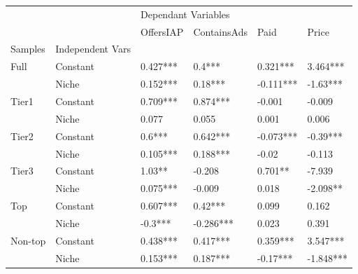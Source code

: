 \begin{table}[h!]
\centering
\begin{tabular}{llllll}
\toprule
        &       & \multicolumn{4}{l}{Dependant Variables} \\
        &       &           OffersIAP & ContainsAds &       Paid &      Price \\
Samples & Independent Vars &                     &             &            &            \\
\midrule
\multirow{2}{*}{Full} & Constant &  0.427*** &  0.4*** &  0.321*** &  3.464*** \\
        & Niche &  0.152*** &  0.18*** &  -0.111*** &  -1.63*** \\
\cline{1-6}
\multirow{2}{*}{Tier1} & Constant &  0.709*** &  0.874*** &  -0.001 &  -0.009 \\
        & Niche &  0.077 &  0.055 &  0.001 &  0.006 \\
\cline{1-6}
\multirow{2}{*}{Tier2} & Constant &  0.6*** &  0.642*** &  -0.073*** &  -0.39*** \\
        & Niche &  0.105*** &  0.188*** &  -0.02 &  -0.113 \\
\cline{1-6}
\multirow{2}{*}{Tier3} & Constant &  1.03** &  -0.208 &  0.701** &  -7.939 \\
        & Niche &  0.075*** &  -0.009 &  0.018 &  -2.098** \\
\cline{1-6}
\multirow{2}{*}{Top} & Constant &  0.607*** &  0.42*** &  0.099 &  0.162 \\
        & Niche &  -0.3*** &  -0.286*** &  0.023 &  0.391 \\
\cline{1-6}
\multirow{2}{*}{Non-top} & Constant &  0.438*** &  0.417*** &  0.359*** &  3.547*** \\
        & Niche &  0.153*** &  0.187*** &  -0.17*** &  -1.848*** \\
\bottomrule
\end{tabular}
\end{table}
